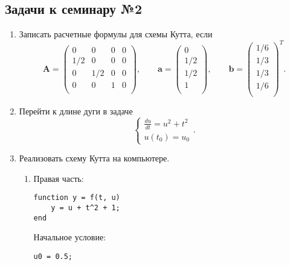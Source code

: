 \subsection{Задачи к семинару №2}
\begin{enumerate}
\item Записать расчетные формулы для схемы Кутта, если
\begin{equation} \nonumber
	\mathbf{A} = 
		\begin{pmatrix}
		0 & 0 & 0 & 0 \\
		1/2 & 0 & 0 & 0 \\
		0 & 1/2 & 0 & 0 \\
		0 & 0 & 1 & 0 \\
		\end{pmatrix},
	\qquad
	\mathbf{a} = 
		\begin{pmatrix}
		0 \\
		1/2 \\
		1/2 \\
		1 \\
		\end{pmatrix},
	\qquad
	\mathbf{b} = 
		\begin{pmatrix}
		1/6 \\
		1/3 \\
		1/3 \\
		1/6 \\
		\end{pmatrix}^T.
\end{equation}
\item Перейти к длине дуги в задаче
\begin{equation} \nonumber
	\begin{cases}
		\displaystyle \frac{du}{dt} = u^2 + t^2 \\
		u(t_0) = u_0
	\end{cases}.
\end{equation}
\item Реализовать схему Кутта на компьютере.
\begin{enumerate}
\item Правая часть: 
\begin{matlablisting}
	\begin{lstlisting}
function y = f(t, u)
    y = u + t^2 + 1;
end
	\end{lstlisting}
\end{matlablisting}
Начальное условие:
\begin{matlablisting}
	\begin{lstlisting}
u0 = 0.5;
	\end{lstlisting}

\end{matlablisting}
\end{enumerate}
\end{enumerate}
